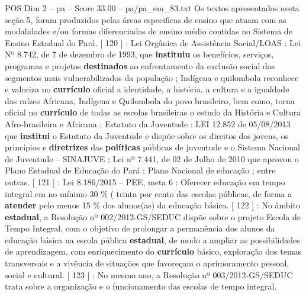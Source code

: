 \begin{textsample}{POS Dim 2 – pa – Score 33.00 – pa/pa\_em\_83.txt}
Os textos apresentados nesta seção 5, foram produzidos pelas áreas especificas de ensino que atuam com as modalidades e/ou formas diferenciadas de ensino médio contidas no Sistema de Ensino Estadual do Pará. [ 120 ] : Lei Orgânica de Assistência Social/LOAS : Lei Nº 8.742, de 7 de dezembro de 1993, que \textbf{instituiu} os benefícios, serviços, programas e projetos \textbf{destinados} ao enfrentamento da exclusão social dos segmentos mais vulnerabilizados da população ; Indígena e quilombola reconhece e valoriza no \textbf{currículo} oficial a identidade, a história, a cultura e a igualdade das raízes Africana, Indígena e Quilombola do povo brasileiro, bem como, torna oficial no \textbf{currículo} de todas as escolas brasileiras o estudo da História e Cultura Afro-brasileira e Africana ; Estatuto da Juventude : LEI 12.852 de 05/08/2013 que \textbf{institui} o Estatuto da Juventude e dispõe sobre os direitos dos jovens, os princípios e \textbf{diretrizes} das \textbf{políticas} públicas de juventude e o Sistema Nacional de Juventude – SINAJUVE ; Lei nº 7.441, de 02 de Julho de 2010 que aprovou o Plano Estadual de Educação do Pará ; Plano Nacional de educação ; entre outras. [ 121 ] : Lei 8.186/2015 – PEE, meta 6 : Oferecer educação em tempo integral em no mínimo 30 \% ( trinta por cento das escolas públicas, de forma a \textbf{atender} pelo menos 15 \% dos alunos(as) da educação básica. [ 122 ] : No âmbito \textbf{estadual}, a Resolução nº 002/2012-GS/SEDUC dispõe sobre o projeto Escola de Tempo Integral, com o objetivo de prolongar a permanência dos alunos da educação básica na escola pública \textbf{estadual}, de modo a ampliar as possibilidades de aprendizagem, com enriquecimento do \textbf{currículo} básico, exploração dos temas transversais e a vivência de situações que favoreçam o aprimoramento pessoal, social e cultural. [ 123 ] : No mesmo ano, a Resolução nº 003/2012-GS/SEDUC trata sobre a organização e o funcionamento das escolas de tempo integral.

\end{textsample}
